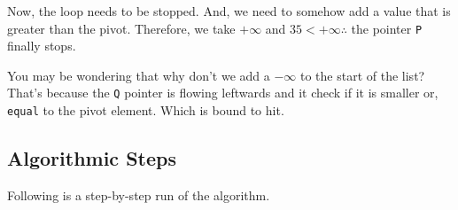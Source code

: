 \documentclass[a4paper,12pt]{article}
\theoremstyle{definition}
\begin{document}
    \noindent
    Now, the loop needs to be stopped. And, we need to somehow add a value that is greater than the pivot.
    Therefore, we take $+\infty$ and $35 < +\infty \therefore$ the pointer \texttt{P} finally stops.

    You may be wondering that why don't we add a $-\infty$ to the start of the list? That's because the \texttt{Q}
    pointer is flowing leftwards and it check if it is smaller or, \texttt{equal} to the pivot element.
    Which is bound to hit.

    \subsection*{Algorithmic Steps}

    Following is a step-by-step run of the algorithm.
\end{document}

